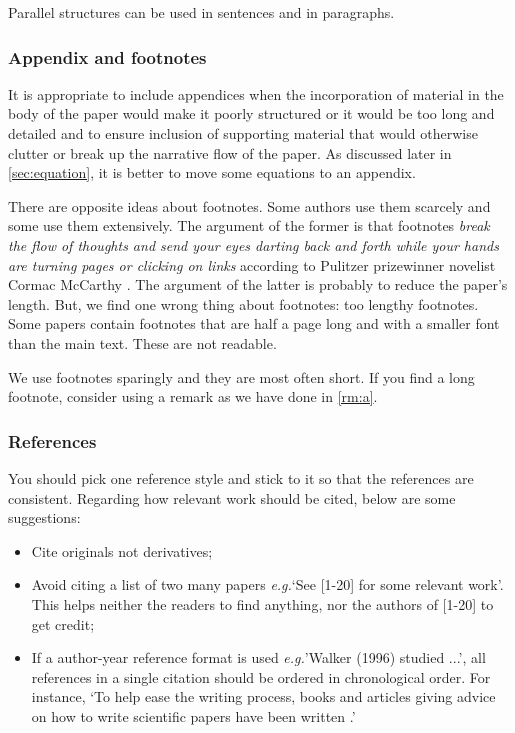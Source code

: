 \documentclass[authoryear,12pta4paper,fleqn]{article}
\newcommand{\eg}{\textit{e.g.}\xspace}
\numberwithin{equation}{section}
\theoremstyle{remark}
\begin{document}
Parallel structures can be used in sentences and in paragraphs. 

\subsubsection{Appendix and footnotes}\label{sec:appendix-footnotes}

It is appropriate to include appendices when
the incorporation of material in the body of the paper would make it poorly structured or it would be too long and detailed and to ensure inclusion of supporting material that would otherwise clutter or break up the narrative flow of the paper.
As discussed later in \cref{sec:equation}, it is better to move some equations to an appendix.

There are opposite ideas about footnotes. Some authors use them scarcely and some use them extensively. The argument of the former is that footnotes \textit{break the flow of thoughts and send your eyes darting back and forth while your hands are turning pages or clicking on links} according to Pulitzer prizewinner novelist Cormac McCarthy \citep{McCarthy}. The argument of the latter is probably to reduce the paper's length. But, we find one wrong thing about footnotes: too lengthy footnotes. Some papers contain footnotes that are half a page long and with a smaller font than the main text. These are not readable.

We use footnotes sparingly and they are most often short. If you find a long footnote, consider using a remark as we have done in \cref{rm:a}.

\subsubsection{References}\label{sec:references}

You should pick one reference style and stick to it so that the references are consistent. Regarding how relevant work should be cited, below are some suggestions:

\begin{itemize}
\item Cite originals not derivatives;
\item Avoid citing a list of two many papers \eg `See [1-20] for some relevant work'. This helps neither the readers to find anything, nor the authors of [1-20] to get credit;
\item If a author-year reference format is used \eg 'Walker (1996) studied ...', all references in a single citation should be ordered in chronological order. For instance, `To help ease the writing process, books and articles giving advice on how to write scientific papers have been written \citep{day1998write,ashby2000write,plaxco2010art}.'
\end{itemize}
\end{document}
